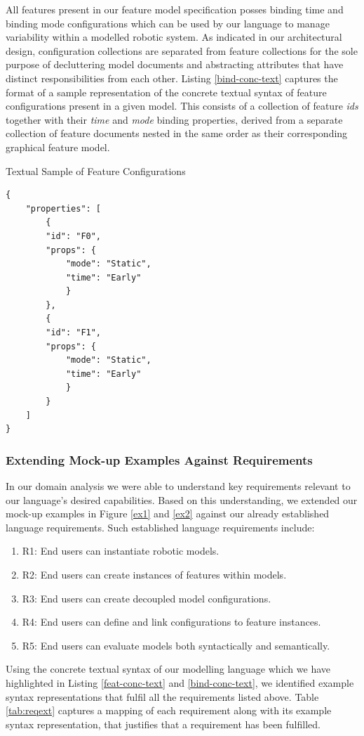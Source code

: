 \documentclass[conference]{IEEEtran}
\begin{document}
All features present in our feature model specification posses binding time and binding mode configurations which can be used by our language to manage variability within a modelled robotic system. As indicated in our architectural design, configuration collections are separated from feature collections for the sole purpose of decluttering model documents and abstracting attributes that have distinct responsibilities from each other. Listing
\ref{bind-conc-text} captures the format of a sample representation of the concrete textual syntax of feature configurations present in a given model. This consists of a collection of feature \textit{ids} together with their \textit{time} and \textit{mode} binding properties, derived from a separate collection of feature documents nested in the same order as their corresponding graphical feature model.

\begin{listing}[H]
\caption{Textual Sample of Feature Configurations}
\begin{verbatim}
{
	"properties": [
	    {
	    "id": "F0",
	    "props": {
	        "mode": "Static",
	        "time": "Early"
	    	}
	    },
	    {
	    "id": "F1",
	    "props": {
	        "mode": "Static",
	        "time": "Early"
	    	}
	    }
	]
}
\end{verbatim}
\label{bind-conc-text}
\end{listing}

\subsubsection{Extending Mock-up Examples Against Requirements}
In our domain analysis we were able to understand key requirements relevant to our language's desired capabilities. Based on this understanding, we extended our mock-up examples in Figure \ref{ex1} and \ref{ex2} against our already established language requirements. Such established language requirements include:
\begin{enumerate}
    \item R1: End users can instantiate robotic models.
    \item R2: End users can create instances of features within models.
    \item R3: End users can create decoupled model configurations.
    \item R4: End users can define and link configurations to feature instances.
    \item R5: End users can evaluate models both syntactically and semantically.
\end{enumerate}
Using the concrete textual syntax of our modelling language which we have highlighted in Listing \ref{feat-conc-text} and \ref{bind-conc-text}, we identified example syntax representations that fulfil all the requirements listed above. Table \ref{tab:reqext} captures a mapping of each requirement along with its example syntax representation, that justifies that a requirement has been fulfilled.
\end{document}
